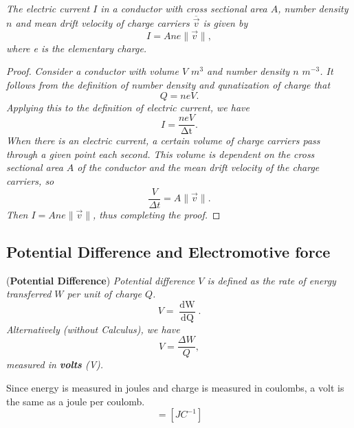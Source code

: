 \begin{theorem}
\textit{The electric current $I$ in a conductor with cross sectional area $A$, number density $n$ and mean drift velocity of charge carriers $\overline{\vec{v}}$ is given by}
\begin{equation}
    I = Ane\|\vec{v}\|,
\end{equation}
\textit{where e is the elementary charge.}

\begin{proof}
\textit{Consider a conductor with volume $V$ $m^3$ and number density $n$ $m^{-3}$. It follows from the definition of number density and qunatization of charge that}
\begin{equation*}
    Q = neV.
\end{equation*}
\textit{Applying this to the definition of electric current, we have}
\begin{equation*}
    I = \frac{neV}{\mathop{\Delta t}}.
\end{equation*}
\textit{When there is an electric current, a certain volume of charge carriers pass through a given point each second. This volume is dependent on the cross sectional area $A$ of the conductor and the mean drift velocity of the charge carriers, so}
\begin{equation*}
    \frac{V}{\Delta t} = A\|\vec{v}\|.
\end{equation*}
\textit{Then $I = Ane\|\vec{v}\|$, thus completing the proof.}
\end{proof}
\end{theorem}

\subsection{Potential Difference and Electromotive force}
\label{subsection:potential-difference}

\begin{definition}{(\textbf{Potential Difference})}
\textit{Potential difference $V$ is defined as the rate of energy transferred $W$ per unit of charge $Q$.}
\begin{equation}
    V = \frac{\mathop{\mathrm{d}W}}{\mathop{\mathrm{d}Q}}.
\end{equation}
\textit{Alternatively (without Calculus), we have}
\begin{equation}
    V = \frac{\Delta W}{Q},
\end{equation}
\textit{measured in \textbf{volts} (V).}
\end{definition}
Since energy is measured in joules and charge is measured in coulombs, a volt is the same as a joule per coulomb.
\begin{equation*}
    [V] = [JC^{-1}]
\end{equation*}






